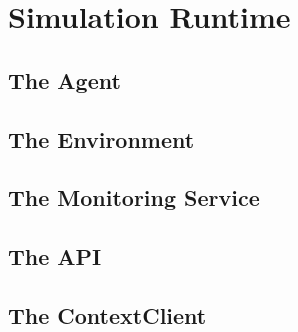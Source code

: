 \section{Simulation Runtime} %
\label{sec:simulation_runtime}
\subsection{The Agent}\label{subsec:agent}
\subsection{The Environment}\label{subsec:environment}
\subsection{The Monitoring Service}\label{subsec:monitoring_service}
\subsection{The API}\label{subsec:api}
\subsection{The ContextClient}\label{subsec:context_client}
